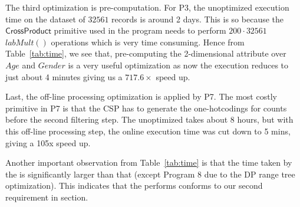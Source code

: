 
The third optimization is pre-computation. For P3, the unoptimized execution time on the dataset of $32561$ records is around 2 days. This is so because the $\textsf{CrossProduct}$ primitive used in the program needs to perform $200\cdot 32561$ $labMult()$ operations which is very time consuming. Hence from Table~\ref{tab:time}, we see that, pre-computing the 2-dimensional attribute over $Age$ and $Gender$ is a very useful optimization as now the execution reduces to just about 4 minutes giving us a $717.6\times$ speed up.

Last, the off-line processing optimization is applied by P7. The most costly primitive in P7 is that the \textsf{CSP} has to generate the one-hotcodings for counts before the second filtering step. The unoptimized \system takes about 8 hours, but with this off-line processing step, the online execution time was cut down to 5 mins, giving a 105x speed up.

Another important observation from Table~\ref{tab:time} is that the time taken by the \AS is significantly larger than that  (except Program 8 due to the DP range tree optimization). This indicates that the \AS performs conforms to our second requirement in section.



